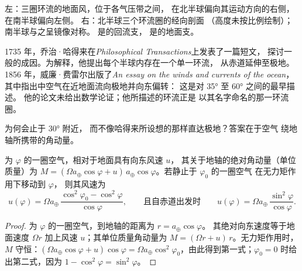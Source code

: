 \begin{omfigure}
{\small 左：三圈环流的地面风，位于各气压带之间，
在北半球偏向其运动方向的右侧，在南半球偏向左侧。
右：北半球三个环流圈的经向剖面
（高度未按比例绘制）；南半球与之呈镜像对称。
是的回流支，
是的地面支。}
\label{fig:b1:atmospheric-circulation:three-cells}
\end{omfigure}

\begin{history}
1735 年，乔治·哈得来在\emph{Philosophical Transactions}上发表了一篇短文，
探讨一般的成因。为解释，他提出每个半球内存在一个单一环流，
从赤道延伸至极地。
1856 年，威廉·费雷尔出版了\emph{An essay on the winds and currents of the
ocean}，其中指出中空气在近地面流向极地并向东偏转：
这是对 \ang{35} 至 \ang{60} 之间的最早描述。
他的论文未给出数学论证；他所描述的环流正是
以其名字命名的那一环流圈。
\end{history}

为何会止于 \ang{30} 附近，
而不像哈得来所设想的那样直达极地？答案在于空气
绕地轴所携带的角动量。

\begin{proposition}[角动量风]\label{prop:b1:atmospheric-circulation:angular-momentum}
为 $\varphi$ 的一圈空气，相对于地面具有向东风速 $u$，
其关于地轴的绝对角动量（单位质量）为 $M =
(\Omega a_\oplus\cos\varphi + u)\,a_\oplus\cos\varphi$。若静止于 $\varphi_0$ 的一圈空气
在无力矩作用下移动到 $\varphi$，
则其风速为
\[
  u(\varphi) = \Omega a_\oplus\,\frac{\cos^2\varphi_0 - \cos^2\varphi}{\cos\varphi},
  \qquad\text{且自赤道出发时}\qquad
  u(\varphi) = \Omega a_\oplus\,\frac{\sin^2\varphi}{\cos\varphi} .
\]
\end{proposition}

\begin{proof}
为 $\varphi$ 的一圈空气，到地轴的距离为 $r = a_\oplus\cos\varphi$。
其绝对向东速度等于地面速度 $\Omega r$ 加上风速
$u$；其单位质量角动量为 $M = (\Omega r + u)\,r$。无力矩作用时，
$M$ 守恒：$(\Omega a_\oplus\cos\varphi + u)\cos\varphi = \Omega a_\oplus
\cos^2\varphi_0$，由此得到第一式；$\varphi_0 = 0$ 时给出第二式，因为
$1 - \cos^2\varphi = \sin^2\varphi$。
\end{proof}

